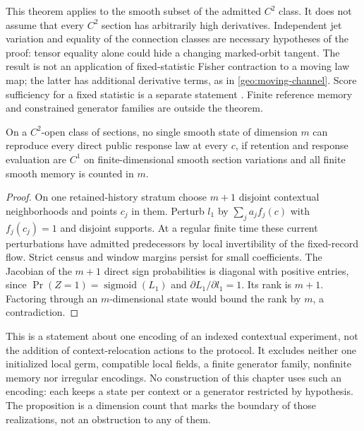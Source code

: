 This theorem applies to the smooth subset of the admitted $C^2$ class. It does not assume that every $C^2$ section has arbitrarily high derivatives. Independent jet variation and equality of the connection classes are necessary hypotheses of the proof: tensor equality alone could hide a changing marked-orbit tangent. The result is not an application of fixed-statistic Fisher contraction to a moving law map; the latter has additional derivative terms, as in \cref{geo:moving-channel}. Score sufficiency for a fixed statistic is a separate statement \citep{Pollard2013}. Finite reference memory and constrained generator families are outside the theorem.

On a $C^2$-open class of sections, no single smooth state of dimension $m$ can reproduce every direct public response law at every $c$, if retention and response evaluation are $C^1$ on finite-dimensional smooth section variations and all finite smooth memory is counted in $m$.
\begin{proof}
On one retained-history stratum choose $m+1$ disjoint contextual neighborhoods and points $c_j$ in them. Perturb $l_1$ by $\sum_j a_j f_j(c)$ with $f_j(c_j)=1$ and disjoint supports. At a regular finite time these current perturbations have admitted predecessors by local invertibility of the fixed-record flow. Strict census and window margins persist for small coefficients. The Jacobian of the $m+1$ direct sign probabilities is diagonal with positive entries, since $\Pr(Z=1)=\operatorname{sigmoid}(L_1)$ and $\partial L_1/\partial l_1=1$. Its rank is $m+1$. Factoring through an $m$-dimensional state would bound the rank by $m$, a contradiction.
\end{proof}

This is a statement about one encoding of an indexed contextual experiment, not the addition of context-relocation actions to the protocol. It excludes neither one initialized local germ, compatible local fields, a finite generator family, nonfinite memory nor irregular encodings. No construction of this chapter uses such an encoding: each keeps a state per context or a generator restricted by hypothesis. The proposition is a dimension count that marks the boundary of those realizations, not an obstruction to any of them.


